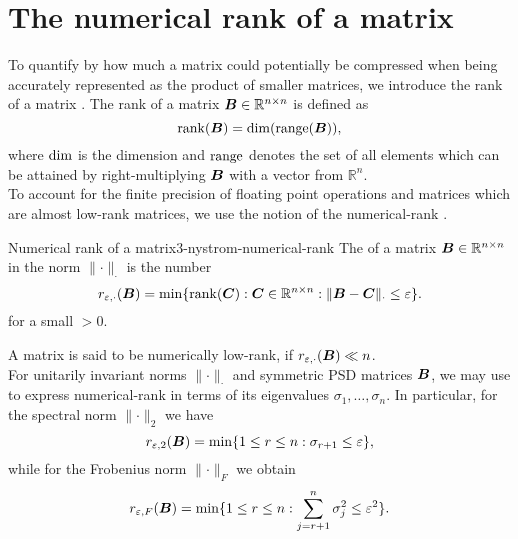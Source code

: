 
\section{The numerical rank of a matrix}
\label{sec:3-nystrom-numerical-rank}

To quantify by how much a matrix could potentially be compressed when being accurately
represented as the product of smaller matrices, we introduce the rank of a
matrix \cite[section~III.3]{hefferon2012linear}.
The rank of a matrix $\boldsymbol{B} \in \mathbb{R}^{n \times n}$ is defined as
\begin{equation}
    \operatorname{rank}(\boldsymbol{B}) = \operatorname{dim}(\operatorname{range}(\boldsymbol{B})),
    \label{equ:3-nystrom-rank}
\end{equation}
where $\operatorname{dim}$ is the dimension and $\operatorname{range}$ denotes the set of all elements
which can be attained by right-multiplying $\boldsymbol{B}$ with a vector from $\mathbb{R}^n$.\\

To account for the finite precision of floating point operations
and matrices which are almost low-rank matrices, we use the
notion of the \gls{numerical-rank} \cite[definition~1.1]{noga2013rank}.
\begin{definition}{Numerical rank of a matrix}{3-nystrom-numerical-rank}
    The  of a matrix $\boldsymbol{B} \in \mathbb{R}^{n \times n}$
    in the norm $\lVert \cdot \rVert _{\cdot}$ is the number
    \begin{equation}
        r_{\varepsilon, \cdot}(\boldsymbol{B}) = \min \{\operatorname{rank}(\boldsymbol{C}): \boldsymbol{C} \in \mathbb{R}^{n \times n}: \lVert \boldsymbol{B} - \boldsymbol{C} \rVert _{\cdot} \leq \varepsilon \}.
        \label{equ:3-nystrom-def-numerical-rank}
    \end{equation}
    for a small  $> 0$.
\end{definition}%
A matrix is said to be numerically low-rank, if $r_{\varepsilon, \cdot}(\boldsymbol{B}) \ll n$.\\ 

For unitarily invariant norms $\lVert \cdot \rVert _{\cdot}$ and 
symmetric \gls{PSD} matrices $\boldsymbol{B}$, we may use
\cite[theorem~5]{mirsky1960truncation} to express \gls{numerical-rank} in terms
of its eigenvalues $\sigma_1, \dots, \sigma_n$.
In particular, for the spectral norm $\lVert \cdot \rVert _2$ we have
\begin{equation}
    r_{\varepsilon, 2}(\boldsymbol{B}) = \min \{1 \leq r \leq n: \sigma_{r+1} \leq \varepsilon \},
    \label{equ:3-nystrom-numerical-rank-spectral-norm}
\end{equation}
while for the Frobenius norm $\lVert \cdot \rVert _F$ we obtain
\begin{equation}
    r_{\varepsilon, F}(\boldsymbol{B}) = \min \{1 \leq r \leq n: \sum_{j=r+1}^n \sigma_{j}^2 \leq \varepsilon^2 \}.
    \label{equ:3-nystrom-numerical-rank-frobenius-norm}
\end{equation}\\

